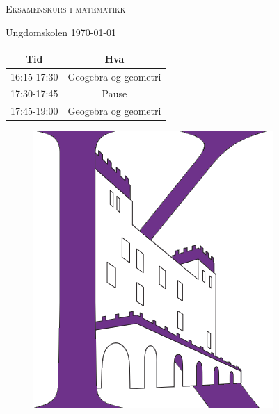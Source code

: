 \documentclass[12pt]{exam}
\begin{document}
\pagestyle{headandfoot}
\runningheadrule
\firstpageheader{}{}{}
\firstpagefooter{}{}{}
\runningfooter{}{}{}



{  \centering

	{\scshape\Huge Eksamenskurs i matematikk \par}
	\vspace{1cm}
	{\Large Ungdomskolen \today \par}
	\vspace{1.5cm}
        \begin{center}
          { \large
          \begin{tabular}{c | c}
            Tid & Hva \\ \hline
            16:15-17:30 & Geogebra og geometri\\ \hline
            17:30-17:45 & Pause \\\hline
            17:45-19:00 & Geogebra og geometri\\\hline
          \end{tabular}
          }
          \vspace{1.5cm}
          \begin{figure}[h!]
            \centering
            \includegraphics[scale = 0.7]{./img/forside.png}                      
          \end{figure}

        \end{center}

}
\end{document}
